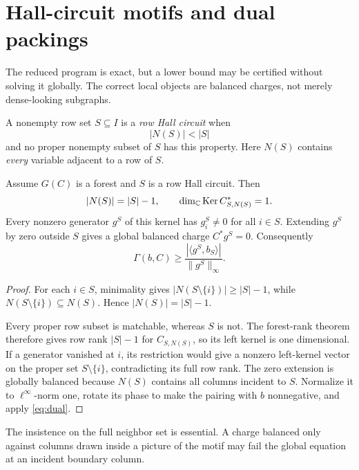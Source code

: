 \section{Hall-circuit motifs and dual packings}
\label{sec:motifs}

The reduced program is exact, but a lower bound may be certified
without solving it globally.  The correct local objects are balanced
charges, not merely dense-looking subgraphs.

\begin{definition}\label{def:hall-circuit}
A nonempty row set \(S\subseteq I\) is a \emph{row Hall circuit} when
\[
 |N(S)|<|S|
\]
and no proper nonempty subset of \(S\) has this property.  Here
\(N(S)\) contains \emph{every} variable adjacent to a row of \(S\).
\end{definition}

\begin{theorem}\label{thm:circuit-charge}
Assume \(G(C)\) is a forest and \(S\) is a row Hall circuit.  Then
\[
 |N(S)|=|S|-1,
 \qquad
 \dim_{\mathbb C}\operatorname{Ker} C_{S,N(S)}^*=1.
\]
Every nonzero generator \(g^S\) of this kernel has
\(g_i^S\ne0\) for all \(i\in S\).  Extending \(g^S\) by zero outside
\(S\) gives a global balanced charge \(C^*g^S=0\).  Consequently
\begin{equation}\label{eq:motif-score}
 \Gamma(b,C)\ge
 \frac{|\langle g^S,b_S\rangle|}
      {\|g^S\|_\infty}.
\end{equation}
\end{theorem}

\begin{proof}
For each \(i\in S\), minimality gives
\(|N(S\setminus\{i\})|\ge|S|-1\), while
\(N(S\setminus\{i\})\subseteq N(S)\).  Hence
\(|N(S)|=|S|-1\).

Every proper row subset is matchable, whereas \(S\) is not.  The
forest-rank theorem therefore gives row rank \(|S|-1\) for
\(C_{S,N(S)}\), so its left kernel is one dimensional.  If a generator
vanished at \(i\), its restriction would give a nonzero left-kernel
vector on the proper set \(S\setminus\{i\}\), contradicting its full
row rank.  The zero extension is globally balanced because \(N(S)\)
contains all columns incident to \(S\).  Normalize it to
\(\ell^\infty\)-norm one, rotate its phase to make the pairing with
\(b\) nonnegative, and apply \eqref{eq:dual}.
\end{proof}

The insistence on the full neighbor set is essential.  A charge
balanced only against columns drawn inside a picture of the motif may
fail the global equation at an incident boundary column.

